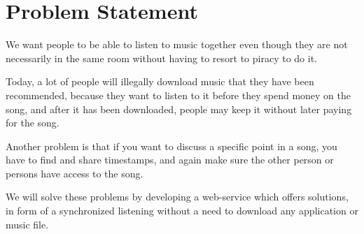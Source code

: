 \section{Problem Statement}
We want people to be able to listen to music together even though they are not
necessarily in the same room without having to resort to piracy to do it.

\vspace{10pt}
Today, a lot of people will illegally download music that they have been
recommended, because they want to listen to it before they spend money
on the song, and after it has been downloaded, people may keep it without
later paying for the song.

Another problem is that if you want to discuss a specific point in a song,
you have to find and share timestamps, and again make sure the other person
or persons have access to the song.

\vspace{10pt}
We will solve these problems by developing a web-service which offers
solutions, in form of a synchronized listening without a need to download
any application or music file.